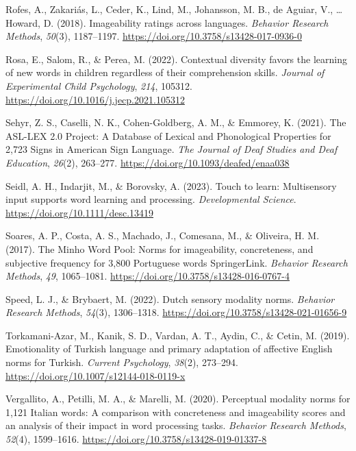 \documentclass[
  man,floatsintext]{apa6}
\newlength{\cslhangindent}
\newlength{\cslentryspacingunit} %
\newenvironment{CSLReferences}[2] %
 {%
  \setlength{\parindent}{0pt}
  \ifodd #1
  \let\oldpar\par
  \def\par{\hangindent=\cslhangindent\oldpar}
  \fi
  \setlength{\parskip}{#2\cslentryspacingunit}
 }%
 {}
\begin{document}
\begin{CSLReferences}{1}{0}
\leavevmode{}%
Rofes, A., Zakariás, L., Ceder, K., Lind, M., Johansson, M. B., de Aguiar, V., \ldots{} Howard, D. (2018). Imageability ratings across languages. \emph{Behavior Research Methods}, \emph{50}(3), 1187--1197. \url{https://doi.org/10.3758/s13428-017-0936-0}

\leavevmode{}%
Rosa, E., Salom, R., \& Perea, M. (2022). Contextual diversity favors the learning of new words in children regardless of their comprehension skills. \emph{Journal of Experimental Child Psychology}, \emph{214}, 105312. \url{https://doi.org/10.1016/j.jecp.2021.105312}

\leavevmode{}%
Sehyr, Z. S., Caselli, N. K., Cohen-Goldberg, A. M., \& Emmorey, K. (2021). The {ASL-LEX} 2.0 {Project}: {A Database} of {Lexical} and {Phonological Properties} for 2,723 {Signs} in {American Sign Language}. \emph{The Journal of Deaf Studies and Deaf Education}, \emph{26}(2), 263--277. \url{https://doi.org/10.1093/deafed/enaa038}

\leavevmode{}%
Seidl, A. H., Indarjit, M., \& Borovsky, A. (2023). Touch to learn: {Multisensory} input supports word learning and processing. \emph{Developmental Science}. \url{https://doi.org/10.1111/desc.13419}

\leavevmode{}%
Soares, A. P., Costa, A. S., Machado, J., Comesana, M., \& Oliveira, H. M. (2017). The {Minho Word Pool}: {Norms} for imageability, concreteness, and subjective frequency for 3,800 {Portuguese} words {\textbar} {SpringerLink}. \emph{Behavior Research Methods}, \emph{49}, 1065--1081. \url{https://doi.org/10.3758/s13428-016-0767-4}

\leavevmode{}%
Speed, L. J., \& Brybaert, M. (2022). Dutch sensory modality norms. \emph{Behavior Research Methods}, \emph{54}(3), 1306--1318. \url{https://doi.org/10.3758/s13428-021-01656-9}

\leavevmode{}%
Torkamani-Azar, M., Kanik, S. D., Vardan, A. T., Aydin, C., \& Cetin, M. (2019). Emotionality of {Turkish} language and primary adaptation of affective {English} norms for {Turkish}. \emph{Current Psychology}, \emph{38}(2), 273--294. \url{https://doi.org/10.1007/s12144-018-0119-x}

\leavevmode{}%
Vergallito, A., Petilli, M. A., \& Marelli, M. (2020). Perceptual modality norms for 1,121 {Italian} words: {A} comparison with concreteness and imageability scores and an analysis of their impact in word processing tasks. \emph{Behavior Research Methods}, \emph{52}(4), 1599--1616. \url{https://doi.org/10.3758/s13428-019-01337-8}


\end{CSLReferences}
\end{document}
